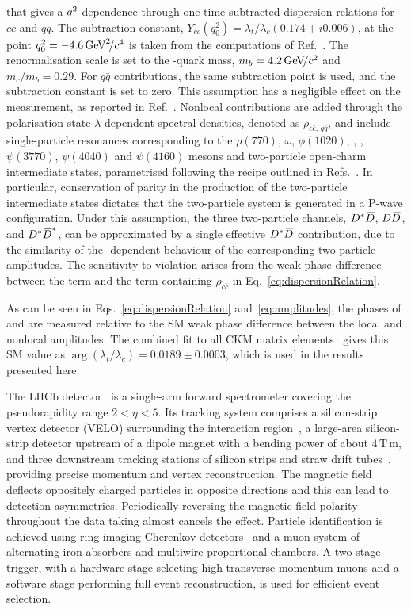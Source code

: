 that gives  a ${q^2}$ dependence through one-time subtracted dispersion relations for $c\bar{c}$ and $q\bar{q}$. The subtraction constant, $Y_{c\bar{c}}(q^{2}_{0})=\lambda_t/\lambda_c (0.174 + i0.006)$, at the point $q_{0}^{2}=-4.6\text{\,Ge\kern -0.1em V}^2\!/c^4$ is taken from the computations of Ref.~\cite{Asatrian:2019kbk}. The renormalisation scale is set to the \bquark-quark mass, $m_b=4.2\text{\,Ge\kern -0.1em V\!/}c^2$ and  $m_{c}/m_{b}=0.29$. For $q\bar{q}$ contributions, the same subtraction point is used, and the subtraction constant is set to zero. This assumption has a negligible effect on the measurement, as reported in Ref.~\cite{LHCb-PAPER-2024-011}. Nonlocal contributions are added through the polarisation state $\lambda$-dependent spectral densities, denoted as $\rho_{c\bar{c},\,q\bar{q}}$, and include single-particle resonances corresponding to the $\rho(770)$, $\omega$, $\phi(1020)$, \jpsi, \psitwos, $\psi(3770)$, $\psi(4040)$ and $\psi(4160)$ mesons and two-particle open-charm intermediate states, parametrised following the recipe outlined in Refs.~\cite{LHCb-PAPER-2024-011,Cornella:2020aoq}. In particular, conservation of parity in the production of the two-particle intermediate states dictates that the two-particle system is generated in a P-wave configuration. Under this assumption, the three two-particle channels, $D^*{\kern 0.18em\overline{\kern -0.18em D}}$, $D{\kern 0.18em\overline{\kern -0.18em D}}$, and $D^*{\kern 0.18em\overline{\kern -0.18em D}}^*$, can be approximated by a single effective $D^*{\kern 0.18em\overline{\kern -0.18em D}}$ contribution, due to the similarity of the \qsq-dependent behaviour of the corresponding two-particle amplitudes. The sensitivity to \CP violation arises from the weak phase difference between the  term and the term containing $\rho_{c \bar{c}}$ in Eq.~\ref{eq:dispersionRelation}.

As can be seen in Eqs.~\ref{eq:dispersionRelation} and~\ref{eq:amplitudes}, the phases of  and  are measured relative to the SM weak phase difference between the local and nonlocal amplitudes. The combined fit to all CKM matrix elements~\cite{CKMfitter2015} gives this SM value as \mbox{$\arg(\lambda_t/\lambda_c) = 0.0189\pm0.0003$}, which is used in the results presented here.

The LHCb detector~\cite{LHCb-DP-2008-001,LHCb-DP-2014-002} is a single-arm forward spectrometer covering the pseudorapidity range $2<\eta<5$. Its tracking system comprises a silicon-strip vertex detector (VELO) surrounding the interaction region~\cite{LHCb-DP-2014-001}, a large-area silicon-strip detector upstream of a dipole magnet with a bending power of about $4\,\mathrm{T\,m}$, and three downstream tracking stations of silicon strips and straw drift tubes~\cite{LHCb-DP-2017-001}, providing precise momentum and vertex reconstruction. The magnetic field deflects oppositely charged particles in opposite directions and this can lead to detection asymmetries. Periodically reversing the magnetic field polarity throughout the data taking almost cancels the effect.
Particle identification is achieved using ring-imaging Cherenkov detectors~\cite{LHCb-DP-2012-003} and a muon system of alternating iron absorbers and multiwire proportional chambers. A two-stage trigger, with a hardware stage selecting high-transverse-momentum muons and a software stage performing full event reconstruction, is used for efficient event selection.

